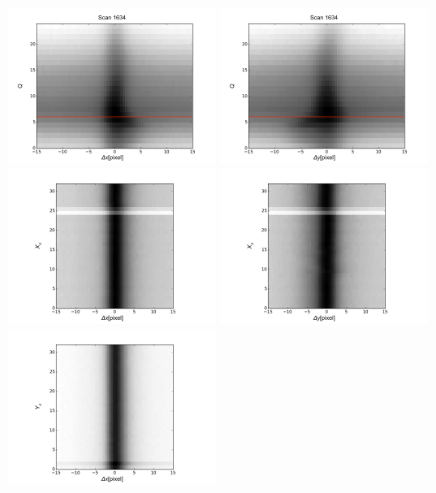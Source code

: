 \documentclass[12pt, preprint]{aastex}
\begin{document}
\begin{figure}[p]
\begin{center}
\includegraphics[width=0.49\textwidth]{figures/q-x_tot-new}
\includegraphics[width=0.49\textwidth]{figures/q-y_tot-new}
\includegraphics[width=0.49\textwidth]{figures/xa-x_tot-new}
\includegraphics[width=0.49\textwidth]{figures/xa-y_tot-new}
\includegraphics[width=0.49\textwidth]{figures/ya-x_tot-new}

\end{center}
\end{figure}
\end{document}
